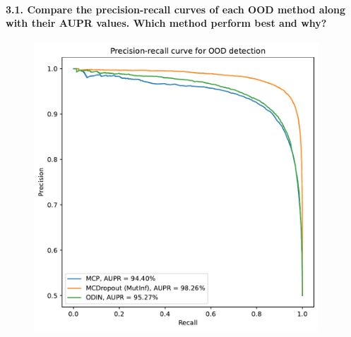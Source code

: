 \paragraph*{3.1. Compare the precision-recall curves of each OOD method along with their AUPR values. Which method perform best and why?}
\begin{figure}[H]
    \centering
    \includegraphics[width=0.95\textwidth]{OOD_aupr.pdf}
    \caption{}
    \label{fig:OOD_aupr}
\end{figure}